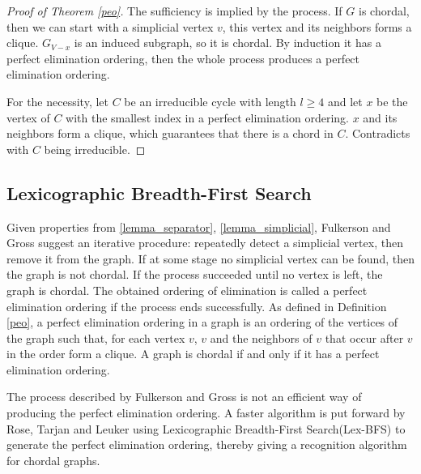 \begin{proof}[Proof of Theorem \ref{peo}]
The sufficiency is implied by the process. If $G$ is chordal, then we can start with a simplicial vertex $v$, this vertex and its neighbors forms a clique. $G_{V-{x}}$ is an induced subgraph, so it is chordal. By induction it has a perfect elimination ordering, then the whole process produces a perfect elimination ordering.

For the necessity, let $C$ be an irreducible cycle with length $l \ge 4$  and let $x$ be the vertex of $C$ with the smallest index in a perfect elimination ordering. $x$ and its neighbors form a clique, which guarantees that there is a chord in $C$. Contradicts with $C$ being irreducible.
\end{proof}

\subsection{Lexicographic Breadth-First Search}

Given properties from \ref{lemma_separator}, \ref{lemma_simplicial}, Fulkerson and Gross \cite{fulkerson1965incidence} suggest an iterative procedure: repeatedly detect a simplicial vertex, then remove it from the graph. If at some stage no simplicial vertex can be found, then the graph is not chordal. If the process succeeded until no vertex is left, the graph is chordal. The obtained ordering of elimination is called a perfect elimination ordering if the process ends successfully. As defined in Definition \ref{peo}, a perfect elimination ordering in a graph is an ordering of the vertices of the graph such that, for each vertex $v$, $v$ and the neighbors of $v$ that occur after $v$ in the order form a clique. A graph is chordal if and only if it has a perfect elimination ordering. 

The process described by Fulkerson and Gross is not an efficient way of producing the perfect elimination ordering. A faster algorithm is put forward by Rose, Tarjan and Leuker\cite{rose1976algorithmic} using Lexicographic Breadth-First Search(Lex-BFS) to generate the perfect elimination ordering, thereby giving a recognition algorithm for chordal graphs.

